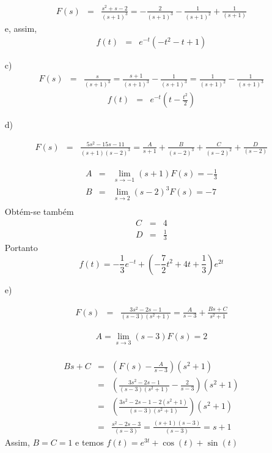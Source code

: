 \begin{Answer}
\begin{itemize}
\begin{eqnarray*}
F(s)&=&\frac{s^2+s-2}{(s+1)^3}=-\frac{2}{(s+1)^3}-\frac{1}{(s+1)^2}+\frac{1}{(s+1)}
\end{eqnarray*}
e, assim,
\begin{eqnarray*}
f(t)&=&e^{-t}\left(-t^2-t+1\right)
\end{eqnarray*}

\item [c)]
\begin{eqnarray*}
F(s)&=&\frac{s}{(s+1)^3}=\frac{s+1}{(s+1)^3}-\frac{1}{(s+1)^3}=\frac{1}{(s+1)^2}-\frac{1}{(s+1)^3}
\end{eqnarray*}
\begin{eqnarray*}
f(t)&=&e^{-t}\left(t-\frac{t^2}{2}\right)
\end{eqnarray*}


 \item [d)]

\begin{eqnarray*}
F(s)&=&\frac{5s^2-15s-11}{(s+1)(s-2)^3}=\frac{A}{s+1}+\frac{B}{(s-2)^3}+\frac{C}{(s-2)^2}+\frac{D}{(s-2)}
\end{eqnarray*}

\begin{eqnarray*}
A&=&\lim_{s\to -1}(s+1)F(s)=-\frac{1}{3}\\
B&=&\lim_{s\to 2}(s-2)^3F(s)=-7\\
\end{eqnarray*}
Obtém-se também
\begin{eqnarray*}
C&=&4\\
D&=&\frac{1}{3}
\end{eqnarray*}
Portanto
$$f(t)=-\frac{1}{3}e^{-t}+\left(-\frac{7}{2}t^2+4t+\frac{1}{3}\right)e^{2t}$$

 \item [e)]

\begin{eqnarray*}
F(s)&=&\frac{3s^2-2s-1}{(s-3)(s^2+1)}=\frac{A}{s-3}+\frac{Bs+C}{s^2+1}
\end{eqnarray*}

\begin{eqnarray*}
A=\lim_{s\to 3}(s-3)F(s)=2\\
\end{eqnarray*}

\begin{eqnarray*}
Bs+C&=&\left(F(s)-\frac{A}{s-3}\right)(s^2+1)\\
&=&\left(\frac{3s^2-2s-1}{(s-3)(s^2+1)}-\frac{2}{s-3}\right)(s^2+1)\\
&=&\left(\frac{3s^2-2s-1-2(s^2+1)}{(s-3)(s^2+1)}\right)(s^2+1)\\
&=&\frac{s^2-2s-3}{(s-3)}=\frac{(s+1)(s-3)}{(s-3)}=s+1
\end{eqnarray*}
Assim, $B=C=1$ e temos
$f(t)=e^{3t}+\cos(t)+\sin(t)$


\end{itemize}
\end{Answer}
